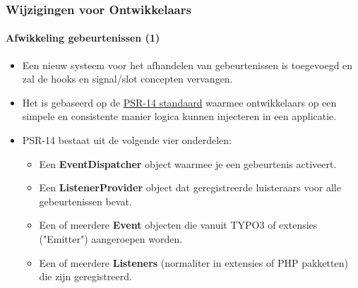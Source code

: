 \begin{frame}[fragile]
	\frametitle{Wijzigingen voor Ontwikkelaars}
	\framesubtitle{Afwikkeling gebeurtenissen (1)}

	\begin{itemize}
		\item Een nieuw systeem voor het afhandelen van gebeurtenissen is toegevoegd en zal
			de hooks en signal/slot concepten vervangen.

		\item Het is gebaseerd op de \href{https://www.php-fig.org/psr/psr-14}{PSR-14 standaard}
			waarmee ontwikkelaars op een simpele en consistente manier logica kunnen injecteren in een applicatie.

		\item PSR-14 bestaat uit de volgende vier onderdelen:

			\begin{itemize}
				\item Een \textbf{EventDispatcher} object waarmee je een gebeurtenis activeert.
				\item Een \textbf{ListenerProvider} object dat geregistreerde luisteraars voor alle gebeurtenissen bevat.
				\item Een of meerdere \textbf{Event} objecten die vanuit TYPO3 of extensies ("Emitter") aangeroepen worden.
				\item Een of meerdere \textbf{Listeners} (normaliter in extensies of PHP pakketten) die zijn geregistreerd.
			\end{itemize}


	\end{itemize}

\end{frame}


